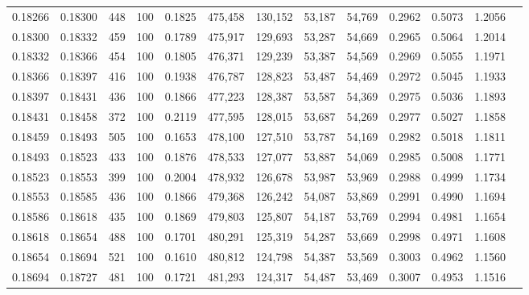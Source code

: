 \begin{tabular}{rrrrrrrrrrrrr}
0.18266 & 0.18300 &   448 & 100 &                                     0.1825 & 475,458 & 130,152 &  53,187 &  54,769 & 0.2962 & 0.5073 & 1.2056 \\
0.18300 & 0.18332 &   459 & 100 &                                     0.1789 & 475,917 & 129,693 &  53,287 &  54,669 & 0.2965 & 0.5064 & 1.2014 \\
0.18332 & 0.18366 &   454 & 100 &                                     0.1805 & 476,371 & 129,239 &  53,387 &  54,569 & 0.2969 & 0.5055 & 1.1971 \\
0.18366 & 0.18397 &   416 & 100 &                                     0.1938 & 476,787 & 128,823 &  53,487 &  54,469 & 0.2972 & 0.5045 & 1.1933 \\
0.18397 & 0.18431 &   436 & 100 &                                     0.1866 & 477,223 & 128,387 &  53,587 &  54,369 & 0.2975 & 0.5036 & 1.1893 \\
0.18431 & 0.18458 &   372 & 100 &                                     0.2119 & 477,595 & 128,015 &  53,687 &  54,269 & 0.2977 & 0.5027 & 1.1858 \\
0.18459 & 0.18493 &   505 & 100 &                                     0.1653 & 478,100 & 127,510 &  53,787 &  54,169 & 0.2982 & 0.5018 & 1.1811 \\
0.18493 & 0.18523 &   433 & 100 &                                     0.1876 & 478,533 & 127,077 &  53,887 &  54,069 & 0.2985 & 0.5008 & 1.1771 \\
0.18523 & 0.18553 &   399 & 100 &                                     0.2004 & 478,932 & 126,678 &  53,987 &  53,969 & 0.2988 & 0.4999 & 1.1734 \\
0.18553 & 0.18585 &   436 & 100 &                                     0.1866 & 479,368 & 126,242 &  54,087 &  53,869 & 0.2991 & 0.4990 & 1.1694 \\
0.18586 & 0.18618 &   435 & 100 &                                     0.1869 & 479,803 & 125,807 &  54,187 &  53,769 & 0.2994 & 0.4981 & 1.1654 \\
0.18618 & 0.18654 &   488 & 100 &                                     0.1701 & 480,291 & 125,319 &  54,287 &  53,669 & 0.2998 & 0.4971 & 1.1608 \\
0.18654 & 0.18694 &   521 & 100 &                                     0.1610 & 480,812 & 124,798 &  54,387 &  53,569 & 0.3003 & 0.4962 & 1.1560 \\
0.18694 & 0.18727 &   481 & 100 &                                     0.1721 & 481,293 & 124,317 &  54,487 &  53,469 & 0.3007 & 0.4953 & 1.1516 \\

\end{tabular}
